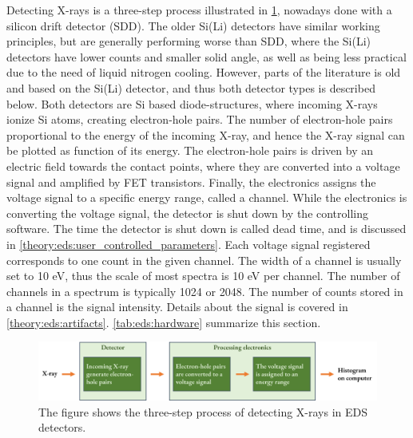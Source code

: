 
Detecting X-rays is a three-step process illustrated in \cref{fig:detecting_xrays}, nowadays done with a silicon drift detector (SDD).
The older Si(Li) detectors have similar working principles, but are generally performing worse than SDD, where the Si(Li) detectors have lower counts and smaller solid angle, as well as being less practical due to the need of liquid nitrogen cooling.
However, parts of the literature is old and based on the Si(Li) detector, and thus both detector types is described below.
Both detectors are Si based diode-structures, where incoming X-rays ionize Si atoms, creating electron-hole pairs.
The number of electron-hole pairs proportional to the energy of the incoming X-ray, and hence the X-ray signal can be plotted as function of its energy.
The electron-hole pairs is driven by an electric field towards the contact points, where they are converted into a voltage signal and amplified by FET transistors.
Finally, the electronics assigns the voltage signal to a specific energy range, called a channel.
While the electronics is converting the voltage signal, the detector is shut down by the controlling software.
The time the detector is shut down is called dead time, and is discussed in \cref{theory:eds:user_controlled_parameters}.
Each voltage signal registered corresponds to one count in the given channel.
The width of a channel is usually set to 10 eV, thus the scale of most spectra is 10 eV per channel.
The number of channels in a spectrum is typically 1024 or 2048.
The number of counts stored in a channel is the signal intensity.
Details about the signal is covered in \cref{theory:eds:artifacts}.
\cref{tab:eds:hardware} summarize this section.


\begin{figure}[ht]
    \centering
    \includegraphics[width=0.9\linewidth]{figures/detecting_xrays.png}
    \caption{
        The figure shows the three-step process of detecting X-rays in EDS detectors.
    }
    \label{fig:detecting_xrays}
\end{figure}




